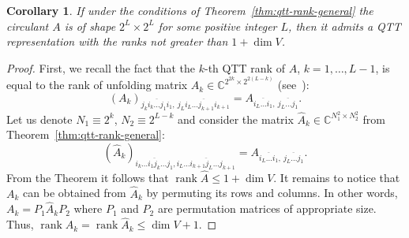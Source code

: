 \documentclass[a4paper]{article}
\newtheorem{corollary}{Corollary}[section]
\newcommand{\LL}{L}
\newcommand{\base}{2}
\DeclareMathOperator{\rank}{rank}
\begin{document}
    \begin{corollary}
        If under the conditions of Theorem~\ref{thm:qtt-rank-general} 
        the circulant $A$ is of shape ${\base^\LL \times \base^\LL}$ for some positive integer $\LL$,
        then it admits a QTT representation with the ranks not greater than $1 + \dim V$.
    \end{corollary}
    \begin{proof}
    First, we recall the fact that the $k$-th QTT rank of $A$, $k = 1,\dots,\LL-1$, is equal to the rank of unfolding matrix $A_k \in \mathbb{C}^{\base^{2k} \times \base^{2(\LL-k)}}$ (see~\cite{osel-tt-2011}):
    \[
    (A_k)_{\overline{j_ki_k\dots j_1i_1},~\overline{j_{\LL}i_{\LL}\dots j_{k+1}i_{k+1}}} = A_{\overline{i_{\LL}\dots i_1},~\overline{j_{\LL}\dots j_1}}.
    \]
    Let us denote $N_1 \equiv \base^k$, $N_2 \equiv \base^{\LL-k}$ and consider the matrix $\widehat{A}_k \in \mathbb{C}^{N_1^2 \times N_2^2}$ from Theorem~\ref{thm:qtt-rank-general}:
    \[
    (\widehat{A}_k)_{\overline{i_k\dots i_1 j_k \dots j_1}, \overline{i_\LL\dots i_{k+1} j_\LL \dots j_{k+1}}} = A_{\overline{i_{\LL}\dots i_1},~\overline{j_{\LL}\dots j_1}}.
    \]
    From the Theorem it follows that $\rank \widehat{A} \le 1 + \dim V$.
    It remains to notice that $A_k$ can be obtained from $\widehat{A}_k$ by permuting its rows and columns.
    In other words, $A_k = P_1 \widehat{A}_k P_2$ where $P_1$ and $P_2$ are permutation matrices of appropriate size.
    Thus, $\rank A_k = \rank \widehat{A}_k \le \dim V + 1$.
    \end{proof}
    
\end{document}
